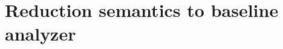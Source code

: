 \documentclass[preprint,onecolumn,9pt]{sigplanconf} %
\begin{document}

\section{Reduction semantics to baseline analyzer}
\label{sec:baseline}
\end{document}
